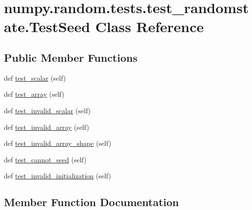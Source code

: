 \hypertarget{classnumpy_1_1random_1_1tests_1_1test__randomstate_1_1TestSeed}{}\section{numpy.\+random.\+tests.\+test\+\_\+randomstate.\+Test\+Seed Class Reference}
\label{classnumpy_1_1random_1_1tests_1_1test__randomstate_1_1TestSeed}
\subsection*{Public Member Functions}
\begin{DoxyCompactItemize}
\item 
def \hyperlink{classnumpy_1_1random_1_1tests_1_1test__randomstate_1_1TestSeed_a54ca45f008ccfc2dd13289b0ff8b54f6}{test\+\_\+scalar} (self)
\item 
def \hyperlink{classnumpy_1_1random_1_1tests_1_1test__randomstate_1_1TestSeed_a32110072896222614674ac59e359ef58}{test\+\_\+array} (self)
\item 
def \hyperlink{classnumpy_1_1random_1_1tests_1_1test__randomstate_1_1TestSeed_a447392d55830b7dc42ade6e70949de3a}{test\+\_\+invalid\+\_\+scalar} (self)
\item 
def \hyperlink{classnumpy_1_1random_1_1tests_1_1test__randomstate_1_1TestSeed_afa12ee45f1bf2b109193bcc772d0a5bd}{test\+\_\+invalid\+\_\+array} (self)
\item 
def \hyperlink{classnumpy_1_1random_1_1tests_1_1test__randomstate_1_1TestSeed_a6231ba92e1df24550b8757b8b551cc63}{test\+\_\+invalid\+\_\+array\+\_\+shape} (self)
\item 
def \hyperlink{classnumpy_1_1random_1_1tests_1_1test__randomstate_1_1TestSeed_adf581154bf08a7e27c5bf9a2be29e7cf}{test\+\_\+cannot\+\_\+seed} (self)
\item 
def \hyperlink{classnumpy_1_1random_1_1tests_1_1test__randomstate_1_1TestSeed_a68f0a6eb2e7560910713667d0d7cba24}{test\+\_\+invalid\+\_\+initialization} (self)
\end{DoxyCompactItemize}


\subsection{Member Function Documentation}
\mbox{\label{classnumpy_1_1random_1_1tests_1_1test__randomstate_1_1TestSeed_a32110072896222614674ac59e359ef58}} 
